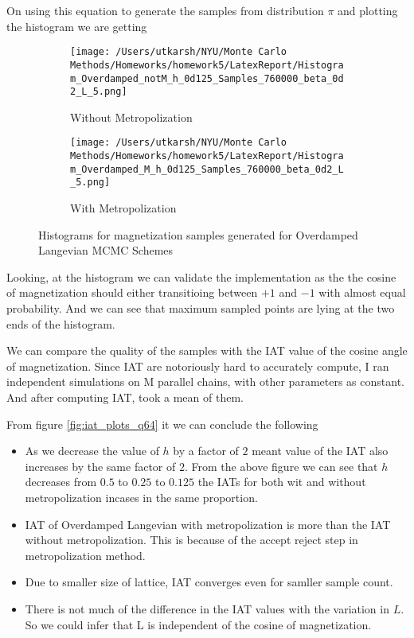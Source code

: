 \documentclass[11pt]{article}
\begin{document}
On using this equation to generate the samples from distribution $\pi$ and plotting the histogram we are getting

\begin{figure}[H]
	\centering
	\begin{subfigure}{.40\textwidth}
		\texttt{[image: /Users/utkarsh/NYU/Monte Carlo Methods/Homeworks/homework5/LatexReport/Histogram\_Overdamped\_notM\_h\_0d125\_Samples\_760000\_beta\_0d2\_L\_5.png]}
		\caption{Without Metropolization}
	\end{subfigure}
	\begin{subfigure}{.40\textwidth}
		\texttt{[image: /Users/utkarsh/NYU/Monte Carlo Methods/Homeworks/homework5/LatexReport/Histogram\_Overdamped\_M\_h\_0d125\_Samples\_760000\_beta\_0d2\_L\_5.png]}
		\caption{With Metropolization}
	\end{subfigure}
	\caption{Histograms for magnetization samples generated for Overdamped Langevian MCMC Schemes}
	\label{fig:histograms_odlv}
\end{figure}
Looking, at the histogram we can validate the implementation as the the cosine of magnetization should either transitioing between $+1$ and $-1$ with almost equal probability. And
we can see that maximum sampled points are lying at the two ends of the histogram.

We can compare the quality of the samples with the IAT value of the cosine angle of magnetization. Since IAT are notoriously hard to accurately compute, I ran independent simulations on M parallel chains, with other parameters as constant.
And after computing IAT, took a mean of them.

From figure \ref{fig:iat_plots_q64} it we can conclude the following
\begin{itemize}
	\item As we decrease the value of $h$ by a factor of $2$ meant value of the IAT also increases by the same factor of $2$. 
	From the above figure we can see that $h$ decreases from $0.5$ to $0.25$ to $0.125$ the IATs for both wit and without metropolization incases in the same proportion.
	\item IAT of Overdamped Langevian with metropolization is more than the IAT without metropolization. This is because 
	of the  accept reject step in metropolization method.
	\item Due to smaller size of lattice, IAT converges even for samller sample count.
	\item There is not much of the difference in the IAT values with the variation in $L$. So we could infer that L is independent of the cosine of magnetization.
\end{itemize}
\end{document}
